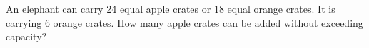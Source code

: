 An elephant can carry 24 equal apple crates or 18 equal orange crates. It is carrying 6 orange crates. How many apple crates can be added without exceeding capacity?
